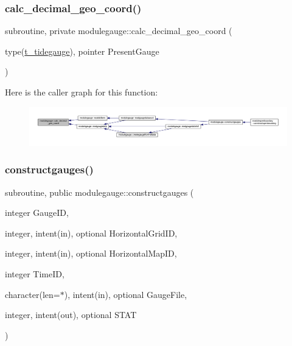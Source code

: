 \subsubsection{\texorpdfstring{calc\+\_\+decimal\+\_\+geo\+\_\+coord()}{calc\_decimal\_geo\_coord()}}
{\footnotesize\ttfamily subroutine, private modulegauge\+::calc\+\_\+decimal\+\_\+geo\+\_\+coord (\begin{DoxyParamCaption}\item[{type(\mbox{\hyperlink{structmodulegauge_1_1t__tidegauge}{t\+\_\+tidegauge}}), pointer}]{Present\+Gauge }\end{DoxyParamCaption})\hspace{0.3cm}{\ttfamily [private]}}

Here is the caller graph for this function\+:\nopagebreak
\begin{figure}[H]
\begin{center}
\leavevmode
\includegraphics[width=350pt]{namespacemodulegauge_adb09b4f645d53ae4da6e979cbda1d5ea_icgraph}
\end{center}
\end{figure}
\mbox{\label{namespacemodulegauge_a5f441d56f4c693dc4323df1e0d702ea6}} 
\subsubsection{\texorpdfstring{constructgauges()}{constructgauges()}}
{\footnotesize\ttfamily subroutine, public modulegauge\+::constructgauges (\begin{DoxyParamCaption}\item[{integer}]{Gauge\+ID,  }\item[{integer, intent(in), optional}]{Horizontal\+Grid\+ID,  }\item[{integer, intent(in), optional}]{Horizontal\+Map\+ID,  }\item[{integer}]{Time\+ID,  }\item[{character(len=$\ast$), intent(in), optional}]{Gauge\+File,  }\item[{integer, intent(out), optional}]{S\+T\+AT }\end{DoxyParamCaption})}

